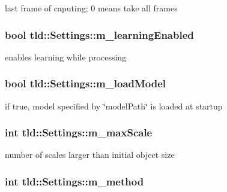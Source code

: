last frame of caputing; 0 means take all frames 

\hypertarget{classtld_1_1_settings_abd4a98a18a910313cf3590f507f1ceef}{
\subsubsection[{m\_\-learningEnabled}]{\setlength{\rightskip}{0pt plus 5cm}bool {\bf tld::Settings::m\_\-learningEnabled}}}
\label{classtld_1_1_settings_abd4a98a18a910313cf3590f507f1ceef}


enables learning while processing 

\hypertarget{classtld_1_1_settings_a6c06df5b2a9028a1c9a77269601f4a36}{
\subsubsection[{m\_\-loadModel}]{\setlength{\rightskip}{0pt plus 5cm}bool {\bf tld::Settings::m\_\-loadModel}}}
\label{classtld_1_1_settings_a6c06df5b2a9028a1c9a77269601f4a36}


if true, model specified by \char`\"{}modelPath\char`\"{} is loaded at startup 

\hypertarget{classtld_1_1_settings_a548c317f8242ea8513d13573acdaaa4c}{
\subsubsection[{m\_\-maxScale}]{\setlength{\rightskip}{0pt plus 5cm}int {\bf tld::Settings::m\_\-maxScale}}}
\label{classtld_1_1_settings_a548c317f8242ea8513d13573acdaaa4c}


number of scales larger than initial object size 

\hypertarget{classtld_1_1_settings_a2438efb226c38f806bf1b3e023aa3760}{
\subsubsection[{m\_\-method}]{\setlength{\rightskip}{0pt plus 5cm}int {\bf tld::Settings::m\_\-method}}}
\label{classtld_1_1_settings_a2438efb226c38f806bf1b3e023aa3760}


